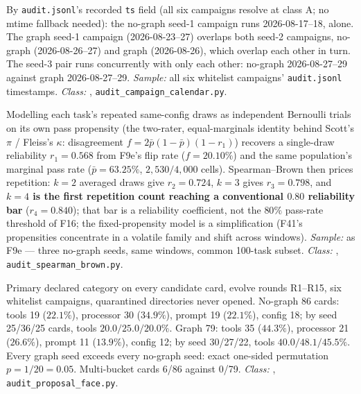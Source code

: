 \begin{description}[leftmargin=0pt,labelindent=0pt,labelsep=0pt,style=nextline,font=\normalfont,itemsep=6pt]
\item[\textbf{F59}\quad Campaign calendar: order and overlap.]
By \texttt{audit.jsonl}'s recorded \texttt{ts} field (all six campaigns
resolve at class A; no mtime fallback needed): the no-graph seed-1 campaign runs
2026-08-17--18, alone. The graph seed-1 campaign (2026-08-23--27) overlaps
both seed-2 campaigns, no-graph (2026-08-26--27) and graph (2026-08-26),
which overlap each other in turn. The seed-3 pair runs concurrently with
only each other: no-graph 2026-08-27--29 against graph 2026-08-27--29.
\emph{Sample:} all six whitelist campaigns' \texttt{audit.jsonl}
timestamps. \emph{Class:} , \texttt{audit\_campaign\_calendar.py}.

\item[\textbf{F60}\quad Spearman--Brown repetition price on the flip rate.]
Modelling each task's repeated same-config draws as independent Bernoulli
trials on its own pass propensity (the two-rater, equal-marginals identity
behind Scott's $\pi$ / Fleiss's $\kappa$: disagreement $f = 2\bar p(1-\bar
p)(1-r_1)$) recovers a single-draw reliability $r_1 = 0.568$ from F9e's
flip rate ($f=20.10\%$) and the same population's marginal pass rate
($\bar p = 63.25\%$, $2{,}530/4{,}000$ cells). Spearman--Brown then prices
repetition: $k{=}2$ averaged draws give $r_2=0.724$, $k{=}3$ gives
$r_3=0.798$, and \textbf{$k{=}4$ is the first repetition count reaching
a conventional $0.80$ reliability bar} ($r_4=0.840$); that bar is a
reliability coefficient, not the $80\%$ pass-rate threshold of F16; the
fixed-propensity model is a simplification (F41's propensities concentrate
in a volatile family and shift across windows).
\emph{Sample:} as F9e --- three no-graph seeds, same windows, common
100-task subset. \emph{Class:} , \texttt{audit\_spearman\_brown.py}.

\item[\textbf{F61}\quad Proposal bucket census --- what the Evolver wrote.]
Primary declared category on every candidate card, evolve rounds R1--R15, six whitelist
campaigns, quarantined directories never opened. No-graph 86 cards: tools 19
($22.1\%$), processor 30 ($34.9\%$), prompt 19 ($22.1\%$), config 18; by seed
25/36/25 cards, tools $20.0/25.0/20.0\%$. Graph 79: tools 35 ($44.3\%$),
processor 21 ($26.6\%$), prompt 11 ($13.9\%$), config 12; by seed 30/27/22,
tools $40.0/48.1/45.5\%$. Every graph seed exceeds every no-graph seed: exact
one-sided permutation $p = 1/20 = 0.05$. Multi-bucket cards 6/86 against
0/79. \emph{Class:} , \texttt{audit\_proposal\_face.py}.


\end{description}

